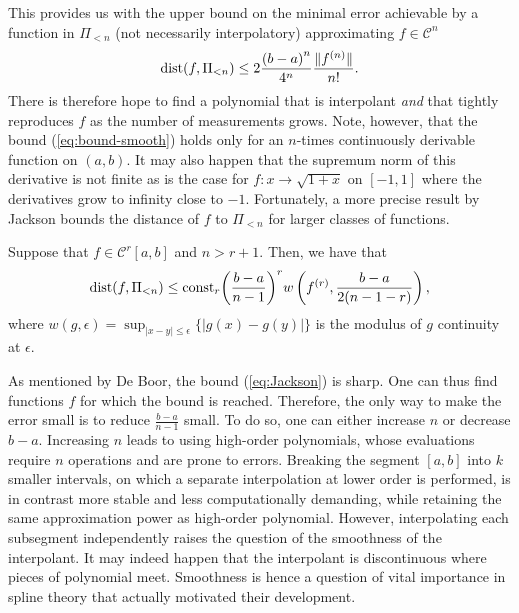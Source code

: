 This provides us with the upper bound on the minimal error achievable by a function in $\Pi_{<n}$ (not necessarily
interpolatory) approximating $f \in \mathcal{C}^n$
\begin{equation}
  \label{eq:bound-smooth}
  \operatorname*{dist} (f, \Pi_{<n}) \leq 2\frac{{(b-a)}^n}{4^n} \frac{\|f^{(n)}\|}{n!}.
\end{equation}
There is therefore hope to find a polynomial that is interpolant \emph{and} that tightly reproduces $f$ as the number of 
measurements grows. Note, however, that the bound (\ref{eq:bound-smooth}) holds only for an $n$-times continuously 
derivable function on $(a,b)$. It may also happen that the supremum norm of this derivative is not finite as is the case 
for $f:x \to \sqrt{1+x}$ on $[-1,1]$ where the derivatives grow to infinity close to $-1$.  Fortunately, a more precise 
result by Jackson bounds the distance of $f$ to $\Pi_{<n}$ for larger classes of functions.

\begin{thm}
  Suppose that $f \in \mathcal{C}^r[a,b]$ and $n > r+1$. Then, we have that
  \begin{equation}
    \label{eq:Jackson}
    \operatorname*{dist}(f, \Pi_{<n}) \leq \text{const}_r {\left(\frac{b-a}{n-1}\right)}^{r} w\left(f^{(r)}, 
    \frac{b-a}{2(n-1-r)}\right),
  \end{equation}
  where $w(g, \epsilon) = \sup_{|x-y| \leq \epsilon} \{ |g(x)-g(y)| \}$ is the modulus of $g$ continuity at
  $\epsilon$.
\end{thm}

As mentioned by De Boor, the bound (\ref{eq:Jackson}) is sharp.  One can thus find functions $f$ for which the bound is
reached. Therefore, the only way to make the error small is to reduce $\frac{b-a}{n-1}$ small. To do so, one can either 
increase $n$ or decrease $b-a$. Increasing $n$ leads to using high-order polynomials, whose evaluations require $n$
operations and are prone to errors. Breaking the segment $[a,b]$ into $k$ smaller intervals, on which
a separate interpolation at lower order is performed, is in contrast more stable and less computationally demanding, 
while retaining the same approximation power as high-order polynomial. However, interpolating  each subsegment 
independently raises the question of the smoothness of the interpolant. It may indeed happen that the interpolant is  
discontinuous where pieces of polynomial meet. Smoothness is hence a question of vital importance in spline theory that 
actually motivated their development.

